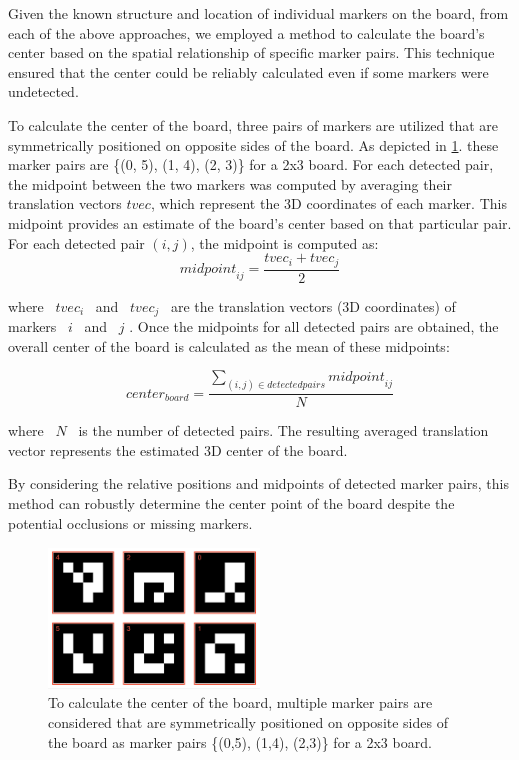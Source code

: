 Given the known structure and location of individual markers on 
the board, from each of the above approaches, 
we employed a method to calculate the board’s center based on the 
spatial relationship of specific marker pairs. This technique ensured 
that the center could be reliably calculated even if some markers were 
undetected.

To calculate the center of the board, three pairs of markers are utilized 
that are symmetrically positioned on opposite sides of the board. As depicted
in \cref{fig:marker_ids}. these marker pairs are \{(0, 5), (1, 4), (2, 3)\}
for a 2x3 board. 
For each detected pair, the midpoint between the two markers was 
computed by averaging their translation vectors \( tvec \), which 
represent the 3D coordinates of each marker. This midpoint provides an 
estimate of the board’s center based on that particular pair.
For each detected pair \((i, j)\), the midpoint is computed as:
\[
{midpoint}_{ij} = \frac{tvec_i + tvec_j}{2}
\]

where  \(tvec_i\)  and  \(tvec_j\)  are the translation vectors 
(3D coordinates) of markers  \(i\)  and  \(j\) . Once the midpoints for 
all detected pairs are obtained, the overall center of the board is 
calculated as the mean of these midpoints:

\[
{center}_{board} = \frac{\sum_{(i, j) \in {detected pairs}} {midpoint}_{ij}}{N}
\]

where  \(N\)  is the number of detected pairs. The resulting averaged 
translation vector represents the estimated 3D center of the board. 


By considering the relative positions and midpoints of detected marker 
pairs, this method can robustly determine the center point of the board despite the potential occlusions or missing markers.

\begin{figure}[htpb]
    \centering
    \includegraphics[width=0.5\textwidth]{media/chapter 5/aruco_board_ids.png}
    \caption{To calculate the center of the board, multiple 
    marker pairs are considered that are symmetrically positioned on opposite sides of the board as marker pairs \{(0,5), (1,4), (2,3)\} for a 2x3 board.}
    \label{fig:marker_ids}
\end{figure}


